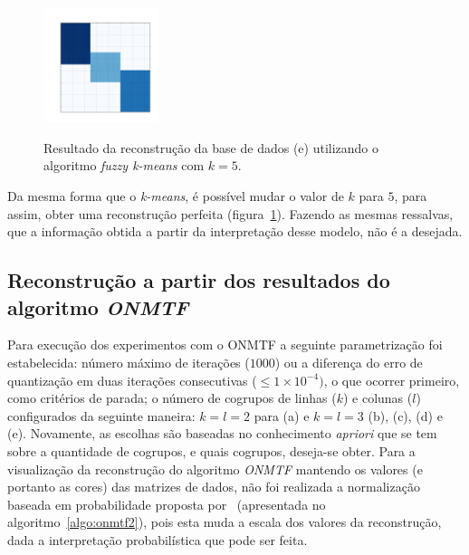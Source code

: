 \documentclass[
    12pt,                %
    oneside,            %
    a4paper,            %
    english,            %
    brazil                %
    ]{abntex2ppgsi}
\begin{document}


\begin{figure}[H]
\centering
    \caption{Resultado da reconstrução da base de dados (e) utilizando o algoritmo \textit{fuzzy k-means} com $k = 5$.}
    \includegraphics[width=0.3\textwidth]{img/e-reconstruction-2-fkmeans.png}
    \label{fig:reconstruction-2:fkmeans}
\end{figure}

Da mesma forma que o \textit{k-means}, é possível mudar o valor de $k$ para $5$, para assim, obter uma reconstrução perfeita (figura~\ref{fig:reconstruction-2:fkmeans}).
Fazendo as mesmas ressalvas, que a informação obtida a partir da interpretação desse modelo, não é a desejada.

\subsection{Reconstrução a partir dos resultados do algoritmo \textit{ONMTF}}
\label{subsec:results-reconstruction-onmtf}

Para execução dos experimentos com o ONMTF a seguinte parametrização foi estabelecida: número máximo de iterações ($1000$) ou a diferença do erro de quantização em duas iterações consecutivas ($\leq 1 \times 10^{-4})$, o que ocorrer primeiro, como critérios de parada; o número de cogrupos de linhas ($k$) e colunas ($l$) configurados da seguinte maneira: $k = l = 2$ para (a) e $k = l = 3$ (b), (c), (d) e (e).
Novamente, as escolhas são baseadas no conhecimento \textit{apriori} que se tem sobre a quantidade de cogrupos, e quais cogrupos, deseja-se obter.
Para a visualização da reconstrução do algoritmo \textit{ONMTF} mantendo os valores (e portanto as cores) das matrizes de dados, não foi realizada a normalização baseada em probabilidade proposta por~ (apresentada no algoritmo~\ref{algo:onmtf2}), pois esta muda a escala dos valores da reconstrução, dada a interpretação probabilística que pode ser feita.
\end{document}
